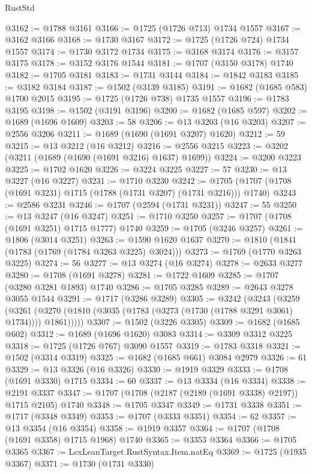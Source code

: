 \begin{lexlean}{RustStd}
\begin{coremodule}
@3162 := @1788 @3161
@3166 := @1725 (@1726 @713) @1734 @1557
@3167 := @3162 @3166
@3168 := @1730 @3167
@3172 := @1725 (@1726 @724) @1734 @1557
@3174 := @1730 @3172 @1734
@3175 := @3168 @3174
@3176 := @3157 @3175
@3178 := @3152 @3176 @1544
@3181 := @1707 (@3150 @3178) @1740
@3182 := @1705 @3181
@3183 := @1731 @3144
@3184 := @1842 @3183
@3185 := @3182 @3184
@3187 := @1502 (@3139 @3185)
@3191 := @1682 (@1685 @583) @1700 @2015
@3195 := @1725 (@1726 @738) @1735 @1557
@3196 := @1783 @3195
@3198 := @1502 (@3191 @3196)
@3200 := @1682 (@1685 @597)
@3202 := @1689 (@1696 @1609)
@3203 := 58
@3206 := @13 @3203 (@16 @3203)
@3207 := @2556 @3206
@3211 := @1689 (@1690 (@1691 @3207) @1620)
@3212 := 59
@3215 := @13 @3212 (@16 @3212)
@3216 := @2556 @3215
@3223 := @3202 (@3211 (@1689 (@1690 (@1691 @3216) @1637) @1699))
@3224 := @3200 @3223
@3225 := @1702 @1620
@3226 := @3224 @3225
@3227 := 57
@3230 := @13 @3227 (@16 @3227)
@3231 := @1710 @3230
@3242 := @1705 (@1707 (@1708 (@1691 @3231) @1715 (@1788 (@1731 @3207) (@1731 @3216))) @1740)
@3243 := @2586 @3231
@3246 := @1707 (@2594 (@1731 @3231))
@3247 := 55
@3250 := @13 @3247 (@16 @3247)
@3251 := @1710 @3250
@3257 := @1707 (@1708 (@1691 @3251) @1715 @1777) @1740
@3259 := @1705 (@3246 @3257)
@3261 := @1806 (@3014 @3251)
@3263 := @1590 @1620 @1637
@3270 := @1810 (@1841 (@1783 (@1769 (@1784 @3263 @3225) @3024)))
@3273 := @1769 (@1770 @3263 @3225)
@3274 := 56
@3277 := @13 @3274 (@16 @3274)
@3278 := @2633 @3277
@3280 := @1708 (@1691 @3278)
@3281 := @1722 @1609
@3285 := @1707 (@3280 @3281 @1893) @1740
@3286 := @1705 @3285
@3289 := @2643 @3278 @3055 @1544
@3291 := @1717 (@3286 @3289)
@3305 := @3242
    (@3243
      (@3259
        (@3261 (@3270 (@1810 (@3035 (@1783 (@3273 (@1730 (@1788 @3291 @3061) @1734)))) @1861)))))
@3307 := @1502 (@3226 @3305)
@3309 := @1682 (@1685 @602)
@3312 := @1689 (@1696 @1620) @3083
@3314 := @3309 @3312 @3225
@3318 := @1725 (@1726 @767) @3090 @1557
@3319 := @1783 @3318
@3321 := @1502 (@3314 @3319)
@3325 := @1682 (@1685 @661) @3084 @2979
@3326 := 61
@3329 := @13 @3326 (@16 @3326)
@3330 := @1919 @3329
@3333 := @1708 (@1691 @3330) @1715
@3334 := 60
@3337 := @13 @3334 (@16 @3334)
@3338 := @2191 @3337
@3347 := @1707 (@1708 (@2187 (@2189 (@1691 @3338) @2197)) @1715 @2105) @1740
@3348 := @1705 @3347
@3349 := @1731 @3338
@3351 := @1717 (@3348 @3349)
@3353 := @1707 (@3333 @3351)
@3354 := 62
@3357 := @13 @3354 (@16 @3354)
@3358 := @1919 @3357
@3364 := @1707 (@1708 (@1691 @3358) @1715 @1968) @1740
@3365 := @3353 @3364
@3366 := @1705 @3365
@3367 := LexLeanTarget.RustSyntax.Item.natEq
@3369 := @1725 (@1935 @3367)
@3371 := @1730 (@1731 @3330)

\end{coremodule}
\end{lexlean}
